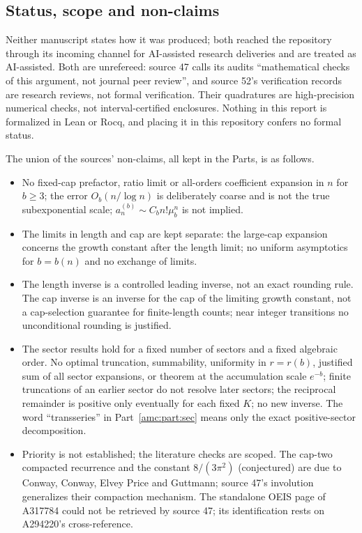\documentclass[11pt,letterpaper]{article}
\theoremstyle{remark}\newtheorem{remark}[theorem]{Remark}
\begin{document}
\subsection*{Status, scope and non-claims}
\label{amc:guide:status}
Neither manuscript states how it was produced; both reached the repository through its incoming channel for AI-assisted research deliveries and are treated as AI-assisted. Both are unrefereed: source 47 calls its audits ``mathematical checks of this argument, not journal peer review'', and source 52's verification records are research reviews, not formal verification. Their quadratures are high-precision numerical checks, not interval-certified enclosures. Nothing in this report is formalized in Lean or Rocq, and placing it in this repository confers no formal status.

The union of the sources' non-claims, all kept in the Parts, is as follows.
\begin{itemize}
\item No fixed-cap prefactor, ratio limit or all-orders coefficient expansion in $n$ for $b\ge3$; the error $O_b(n/\log n)$ is deliberately coarse and is not the true subexponential scale; $a_n^{(b)}\sim C_bn!\mu_b^n$ is not implied.
\item The limits in length and cap are kept separate: the large-cap expansion concerns the growth constant after the length limit; no uniform asymptotics for $b=b(n)$ and no exchange of limits.
\item The length inverse is a controlled leading inverse, not an exact rounding rule. The cap inverse is an inverse for the cap of the limiting growth constant, not a cap-selection guarantee for finite-length counts; near integer transitions no unconditional rounding is justified.
\item The sector results hold for a fixed number of sectors and a fixed algebraic order. No optimal truncation, summability, uniformity in $r=r(b)$, justified sum of all sector expansions, or theorem at the accumulation scale $e^{-b}$; finite truncations of an earlier sector do not resolve later sectors; the reciprocal remainder is positive only eventually for each fixed $K$; no new inverse. The word ``transseries'' in Part~\ref{amc:part:sec} means only the exact positive-sector decomposition.
\item Priority is not established; the literature checks are scoped. The cap-two compacted recurrence and the constant $8/(3\pi^2)$ (conjectured) are due to Conway, Conway, Elvey Price and Guttmann; source 47's involution generalizes their compaction mechanism. The standalone OEIS page of A317784 could not be retrieved by source 47; its identification rests on A294220's cross-reference.
\end{itemize}
\end{document}
